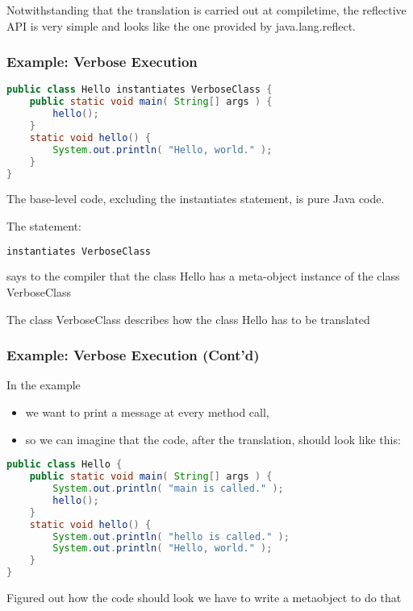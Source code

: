 Notwithstanding that the translation is carried out at compiletime, the reflective API is very simple and looks like the one provided by java.lang.reflect.

\subsubsection{Example: Verbose Execution}

\begin{lstlisting}[language=Java]
public class Hello instantiates VerboseClass {
	public static void main( String[] args ) {
		hello();
	}
	static void hello() {
		System.out.println( "Hello, world." );
	}
}
\end{lstlisting}

The base-level code, excluding the instantiates statement, is pure Java code.

The statement:

\begin{lstlisting}[language=Java]
instantiates VerboseClass
\end{lstlisting}

says to the compiler that the class Hello has a meta-object instance of the class VerboseClass

The class VerboseClass describes how the class Hello has to be translated

\subsubsection{Example: Verbose Execution (Cont'd)}

In the example

\begin{itemize}
	\item we want to print a message at every method call,
	\item so we can imagine that the code, after the translation, should look like this:
\end{itemize}

\begin{lstlisting}[language=Java]
public class Hello {
	public static void main( String[] args ) {
		System.out.println( "main is called." );
		hello();
	}
	static void hello() {
		System.out.println( "hello is called." );
		System.out.println( "Hello, world." );
	}
}
\end{lstlisting}

Figured out how the code should look we have to write a metaobject to do that

